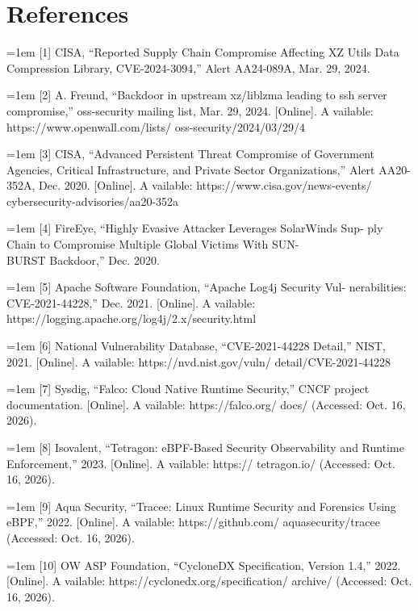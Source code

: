 \documentclass[conference]{IEEEtran}
\begin{document}
\section*{References}
\par\noindent\hangindent=1em {[}1{]} CISA, ``Reported Supply Chain Compromise Affecting XZ Utils Data Compression Library, CVE-2024-3094,'' Alert AA24-089A, Mar. 29, 2024.
\par\noindent\hangindent=1em {[}2{]} A. Freund, ``Backdoor in upstream xz/liblzma leading to ssh server compromise,'' oss-security mailing list, Mar. 29, 2024. {[}Online{]}. A vailable: https://www.openwall.com/lists/ oss-security/2024/03/29/4
\par\noindent\hangindent=1em {[}3{]} CISA, ``Advanced Persistent Threat Compromise of Government Agencies, Critical Infrastructure, and Private Sector Organizations,'' Alert AA20-352A, Dec. 2020. {[}Online{]}. A vailable: https://www.cisa.gov/news-events/ cybersecurity-advisories/aa20-352a
\par\noindent\hangindent=1em {[}4{]} FireEye, ``Highly Evasive Attacker Leverages SolarWinds Sup- ply Chain to Compromise Multiple Global Victims With SUN-\\BURST Backdoor,'' Dec. 2020.
\par\noindent\hangindent=1em {[}5{]} Apache Software Foundation, ``Apache Log4j Security Vul- nerabilities: CVE-2021-44228,'' Dec. 2021. {[}Online{]}. A vailable: https://logging.apache.org/log4j/2.x/security.html
\par\noindent\hangindent=1em {[}6{]} National Vulnerability Database, ``CVE-2021-44228 Detail,'' NIST, 2021. {[}Online{]}. A vailable: https://nvd.nist.gov/vuln/ detail/CVE-2021-44228
\par\noindent\hangindent=1em {[}7{]} Sysdig, ``Falco: Cloud Native Runtime Security,'' CNCF project documentation. {[}Online{]}. A vailable: https://falco.org/ docs/ (Accessed: Oct. 16, 2026).
\par\noindent\hangindent=1em {[}8{]} Isovalent, ``Tetragon: eBPF-Based Security Observability and Runtime Enforcement,'' 2023. {[}Online{]}. A vailable: https:// tetragon.io/ (Accessed: Oct. 16, 2026).
\par\noindent\hangindent=1em {[}9{]} Aqua Security, ``Tracee: Linux Runtime Security and Forensics Using eBPF,'' 2022. {[}Online{]}. A vailable: https://github.com/ aquasecurity/tracee (Accessed: Oct. 16, 2026).
\par\noindent\hangindent=1em {[}10{]} OW ASP Foundation, ``CycloneDX Specification, Version 1.4,'' 2022. {[}Online{]}. A vailable: https://cyclonedx.org/specification/ archive/ (Accessed: Oct. 16, 2026).
\end{document}
